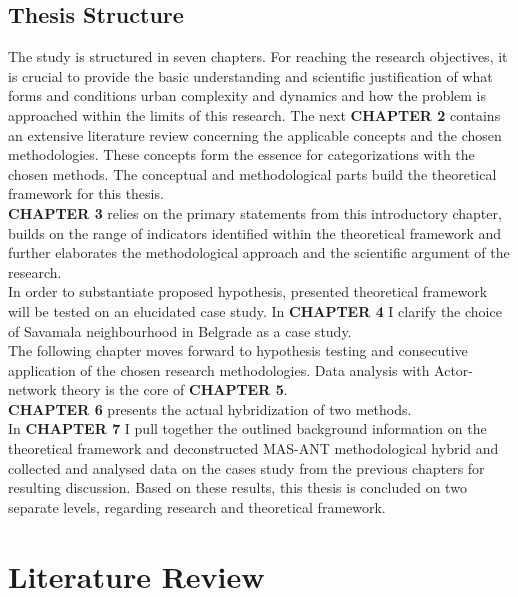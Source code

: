 \documentclass[11pt]{report}
\begin{document}
\section{Thesis Structure}

The study is structured in seven chapters.
For reaching the research objectives, it is crucial to provide the basic understanding and scientific justification of what forms and conditions urban complexity and dynamics and how the problem is approached within the limits of this research. The next \textbf{CHAPTER 2} contains an extensive literature review concerning the applicable concepts and the chosen methodologies. These concepts form the essence for categorizations with the chosen methods.
The conceptual and methodological parts build the theoretical framework for this thesis. 
\\
\textbf{CHAPTER 3} relies on the primary statements from this introductory chapter, builds on the range of indicators identified within the theoretical framework and further elaborates the methodological approach and the scientific argument of the research.
\\
In order to substantiate proposed hypothesis,  presented  theoretical framework will be tested on an elucidated case study. In \textbf{CHAPTER 4} I clarify the choice of Savamala neighbourhood in Belgrade as a case study.
\\
The following chapter moves forward to hypothesis testing and consecutive application of the chosen research methodologies. Data analysis with Actor-network theory is the core of \textbf{CHAPTER 5}.
\\
\textbf{CHAPTER 6} presents the actual hybridization of two methods.
\\
In \textbf{CHAPTER 7} I pull together the  outlined  background  information on the theoretical framework and deconstructed MAS-ANT methodological hybrid and collected and analysed data on the cases study from  the previous  chapters  for  resulting  discussion. Based on these results, this thesis is concluded on two separate levels, regarding research and theoretical framework.



\chapter{Literature Review}

\end{document}
